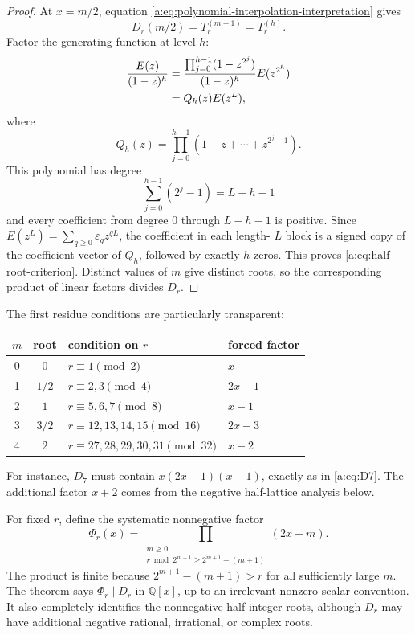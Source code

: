 \documentclass[11pt,a4paper,oneside,openany]{book}
\numberwithin{equation}{chapter}
\theoremstyle{definition}
\theoremstyle{remark}
\newcommand{\Q}{\mathbb Q}
\newcommand{\eps}{\varepsilon}
\newcommand{\Diag}{D}
\newcommand{\Prefix}{T}
\begin{document}
\begin{proof}
At \(x=m/2\), equation \eqref{a:eq:polynomial-interpolation-interpretation}
gives
\[
 \Diag_r(m/2)=\Prefix_r^{(m+1)}=\Prefix_r^{(h)}.
\]
Factor the generating function at level \(h\):
\begin{align}
 \frac{E(z)}{(1-z)^h}
 &=\frac{\prod_{j=0}^{h-1}(1-z^{2^j})}{(1-z)^h}
   E(z^{2^h})\notag\\
 &=Q_h(z)E(z^L),
 \label{a:eq:Qh-factorization-preview}
\end{align}
where
\begin{equation}
 Q_h(z)=\prod_{j=0}^{h-1}
 (1+z+\cdots+z^{2^j-1}).
 \label{a:eq:Qh-definition-preview}
\end{equation}
This polynomial has degree
\[
 \sum_{j=0}^{h-1}(2^j-1)=L-h-1
\]
and every coefficient from degree \(0\) through \(L-h-1\) is positive.
Since \(E(z^L)=\sum_{q\ge0}\eps_qz^{qL}\), the coefficient in each length-
\(L\) block is a signed copy of the coefficient vector of \(Q_h\), followed by
exactly \(h\) zeros.  This proves \eqref{a:eq:half-root-criterion}.  Distinct
values of \(m\) give distinct roots, so the corresponding product of linear
factors divides \(\Diag_r\).
\end{proof}

The first residue conditions are particularly transparent:
\begin{center}
\begin{tabular}{ccll}
\toprule
\(m\) & root & condition on \(r\) & forced factor \\
\midrule
0 & \(0\) & \(r\equiv1\pmod2\) & \(x\) \\
1 & \(1/2\) & \(r\equiv2,3\pmod4\) & \(2x-1\) \\
2 & \(1\) & \(r\equiv5,6,7\pmod8\) & \(x-1\) \\
3 & \(3/2\) & \(r\equiv12,13,14,15\pmod{16}\) & \(2x-3\) \\
4 & \(2\) & \(r\equiv27,28,29,30,31\pmod{32}\) & \(x-2\) \\
\bottomrule
\end{tabular}
\end{center}
For instance, \(\Diag_7\) must contain \(x(2x-1)(x-1)\), exactly as in
\eqref{a:eq:D7}.  The additional factor \(x+2\) comes from the negative
half-lattice analysis below.

For fixed \(r\), define the systematic nonnegative factor
\begin{equation}
 \Phi_r(x)=
 \prod_{\substack{m\ge0\\
 r\bmod 2^{m+1}\ge2^{m+1}-(m+1)}}(2x-m).
 \label{a:eq:Phi-factor}
\end{equation}
The product is finite because \(2^{m+1}-(m+1)>r\) for all sufficiently large
\(m\).  The theorem says \(\Phi_r\mid\Diag_r\) in \(\Q[x]\), up to an
irrelevant nonzero scalar convention.  It also completely identifies the
nonnegative half-integer roots, although \(\Diag_r\) may have additional
negative rational, irrational, or complex roots.
\end{document}
